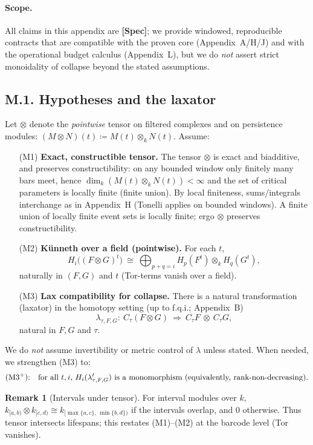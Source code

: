 \documentclass[11pt]{article}
\DeclareRobustCommand{\hyp}{\nobreakdash-}
\numberwithin{equation}{section}
\theoremstyle{definition}
\newtheorem{remark}[theorem]{Remark}
\begin{document}
\paragraph{Scope.}
All claims in this appendix are \textbf{[Spec]}; we provide windowed, reproducible contracts that are compatible with the proven core (Appendix~A/H/J) and with the operational budget calculus (Appendix~L), but we do \emph{not} assert strict monoidality of collapse beyond the stated assumptions.

\subsection*{M.1. Hypotheses and the laxator}
Let \(\otimes\) denote the \emph{pointwise} tensor on filtered complexes and on persistence modules:
\((M\otimes N)(t)\coloneqq M(t)\otimes_k N(t)\).
Assume:
\begin{itemize}\itemsep0.35em
  \item[(M1)] \textbf{Exact, constructible tensor.} The tensor \(\otimes\) is exact and biadditive, and preserves constructibility: on any bounded window only finitely many bars meet, hence \(\dim_k(M(t)\otimes_k N(t))<\infty\) and the set of critical parameters is locally finite (finite union). By local finiteness, sums/integrals interchange as in Appendix~H (Tonelli applies on bounded windows). A finite union of locally finite event sets is locally finite; ergo \(\otimes\) preserves constructibility.
  \item[(M2)] \textbf{Künneth over a field (pointwise).} For each \(t\),
  \[
  H_i\!\big((F\otimes G)^t\big)\ \cong\ \bigoplus_{p+q=i} H_p(F^t)\otimes_k H_q(G^t),
  \]
  naturally in \((F,G)\) and \(t\) (Tor-terms vanish over a field).
  \item[(M3)] \textbf{Lax compatibility for collapse.} There is a natural transformation (laxator) in the homotopy setting (up to f.q.i.; Appendix~B)
  \[
     \lambda_{\tau,F,G}:\ C_\tau(F\otimes G)\ \Longrightarrow\ C_\tau F\ \otimes\ C_\tau G,
  \]
  natural in \(F,G\) and \(\tau\).
\end{itemize}
We do \emph{not} assume invertibility or metric control of \(\lambda\) unless stated.
When needed, we strengthen (M3) to:
\[
\text{(M3$^{+}$):\quad for all \(t,i\), }H_i(\lambda_{\tau,F,G}^t)\text{ is a monomorphism (equivalently, rank-non\hyp decreasing).}
\]

\begin{remark}[Intervals under tensor]\label{M:rk:interval}
For interval modules over \(k\),
\(k_{[a,b)}\otimes k_{[c,d)} \cong k_{[\max\{a,c\},\,\min\{b,d\})}\) if the intervals overlap, and \(0\) otherwise.
Thus tensor intersects lifespans; this restates (M1)–(M2) at the barcode level (Tor vanishes).
\end{remark}
\end{document}
